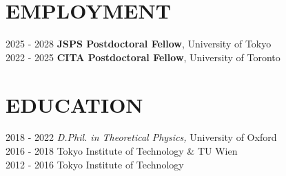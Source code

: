 \documentclass[]{res}
\begin{document}
\begin{resume}

\section{EMPLOYMENT}
\noindent
\begin{tabbing}
    2025 - 2028 \hspace{2mm} \=\textbf{JSPS Postdoctoral Fellow}, University of Tokyo\\
    2022 - 2025 \hspace{2mm} \=\textbf{CITA Postdoctoral Fellow}, University of Toronto
\end{tabbing}

\section{EDUCATION}
\noindent
\begin{tabbing}
    2018 - 2022 \hspace{2mm} \={\sl D.Phil. in Theoretical Physics,} University of Oxford\\
    2016 - 2018 \hspace{2mm}  Tokyo Institute of Technology \& TU Wien\\ 
    2012 - 2016 \hspace{2mm}  Tokyo Institute of Technology
\end{tabbing}


\end{resume}
\end{document}
